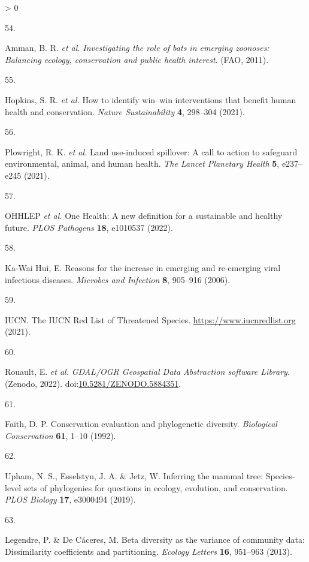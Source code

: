 \documentclass[10pt,oneside]{article}
\newlength{\cslhangindent}
\newlength{\csllabelwidth}
\newenvironment{CSLReferences}[3] %
 {%
  \setlength{\parindent}{0pt}
  \ifodd #1 \everypar{\setlength{\hangindent}{\cslhangindent}}\ignorespaces\fi
  \ifnum #2 > 0
  \setlength{\parskip}{#2\baselineskip}
  \fi
 }%
 {}
\newcommand{\CSLLeftMargin}[1]{\parbox[t]{\maxof{\widthof{#1}}{\csllabelwidth}}{#1}}
\newcommand{\CSLRightInline}[1]{\parbox[t]{\linewidth}{#1}}
\begin{document}
\begin{CSLReferences}{0}{0}
\leavevmode\hypertarget{ref-Amman2011Investigating}{}%
\CSLLeftMargin{54. }
\CSLRightInline{Amman, B. R. \emph{et al.} \emph{Investigating the role
of bats in emerging zoonoses: Balancing ecology, conservation and public
health interest}. (FAO, 2011).}

\leavevmode\hypertarget{ref-Hopkins2021How}{}%
\CSLLeftMargin{55. }
\CSLRightInline{Hopkins, S. R. \emph{et al.} How to identify win--win
interventions that benefit human health and conservation. \emph{Nature
Sustainability} \textbf{4}, 298--304 (2021).}

\leavevmode\hypertarget{ref-Plowright2021Land}{}%
\CSLLeftMargin{56. }
\CSLRightInline{Plowright, R. K. \emph{et al.} Land use-induced
spillover: A call to action to safeguard environmental, animal, and
human health. \emph{The Lancet Planetary Health} \textbf{5}, e237--e245
(2021).}

\leavevmode\hypertarget{ref-OHHLEP2022One}{}%
\CSLLeftMargin{57. }
\CSLRightInline{OHHLEP \emph{et al.} One Health: A new definition for a
sustainable and healthy future. \emph{PLOS Pathogens} \textbf{18},
e1010537 (2022).}

\leavevmode\hypertarget{ref-Ka-WaiHui2006Reasons}{}%
\CSLLeftMargin{58. }
\CSLRightInline{Ka-Wai Hui, E. Reasons for the increase in emerging and
re-emerging viral infectious diseases. \emph{Microbes and Infection}
\textbf{8}, 905--916 (2006).}

\leavevmode\hypertarget{ref-IUCN2021Iucn}{}%
\CSLLeftMargin{59. }
\CSLRightInline{IUCN. The IUCN Red List of Threatened Species.
\url{https://www.iucnredlist.org} (2021).}

\leavevmode\hypertarget{ref-RouaultEven2022Gdal}{}%
\CSLLeftMargin{60. }
\CSLRightInline{Rouault, E. \emph{et al.} \emph{GDAL/OGR Geospatial Data
Abstraction software Library}. (Zenodo, 2022).
doi:\href{https://doi.org/10.5281/ZENODO.5884351}{10.5281/ZENODO.5884351}.}

\leavevmode\hypertarget{ref-Faith1992Conservation}{}%
\CSLLeftMargin{61. }
\CSLRightInline{Faith, D. P. Conservation evaluation and phylogenetic
diversity. \emph{Biological Conservation} \textbf{61}, 1--10 (1992).}

\leavevmode\hypertarget{ref-Upham2019Inferring}{}%
\CSLLeftMargin{62. }
\CSLRightInline{Upham, N. S., Esselstyn, J. A. \& Jetz, W. Inferring the
mammal tree: Species-level sets of phylogenies for questions in ecology,
evolution, and conservation. \emph{PLOS Biology} \textbf{17}, e3000494
(2019).}

\leavevmode\hypertarget{ref-Legendre2013Beta}{}%
\CSLLeftMargin{63. }
\CSLRightInline{Legendre, P. \& De Cáceres, M. Beta diversity as the
variance of community data: Dissimilarity coefficients and partitioning.
\emph{Ecology Letters} \textbf{16}, 951--963 (2013).}


\end{CSLReferences}
\end{document}

